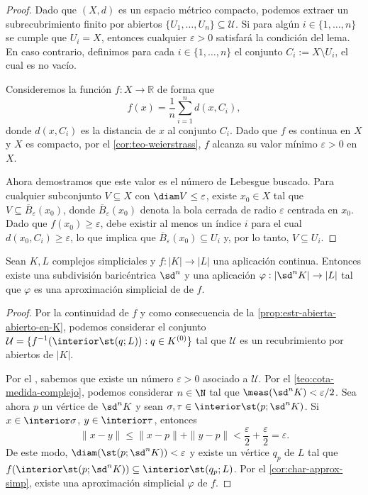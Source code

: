 \begin{proof}
	Dado que \((X,d)\) es un espacio métrico compacto, podemos extraer un subrecubrimiento finito por abiertos \(\{U_1, \ldots, U_n\} \subseteq \mathcal{U}\). Si para algún \(i \in \{1, \dots, n\}\) se cumple que \(U_i = X\), entonces cualquier \(\varepsilon > 0\) satisfará la condición del lema. En caso contrario, definimos para cada \(i \in \{1, \ldots, n\}\) el conjunto \(C_i := X \setminus U_i\), el cual es no vacío.

	Consideremos la función \( f \colon X \to \mathbb{R} \) de forma que
	\[
		f(x) = \frac{1}{n} \sum_{i=1}^{n} d(x, C_i),
	\]
	donde \(d(x, C_i)\) es la distancia de \(x\) al conjunto \(C_i\). Dado que \(f\) es continua en \(X\) y \(X\) es compacto, por el \autoref{cor:teo-weierstrass}, \(f\) alcanza su valor mínimo \(\varepsilon > 0\) en \(X\).

	Ahora demostramos que este valor es el número de Lebesgue buscado. Para cualquier subconjunto \(V \subseteq X\) con \(\diam V \leq \varepsilon\), existe \(x_0 \in X\) tal que \(V \subseteq \overline{B}_{\varepsilon}(x_0)\), donde \(\overline{B}_{\varepsilon}(x_0)\) denota la bola cerrada de radio \(\varepsilon\) centrada en \(x_0\). Dado que \(f(x_0) \geq \varepsilon\), debe existir al menos un índice \(i\) para el cual \(d(x_0, C_i) \geq \varepsilon\), lo que implica que \(\overline{B}_{\varepsilon}(x_0) \subseteq U_i\) y, por lo tanto, \(V \subseteq U_i\).
\end{proof}
\begin{teorema}
	\label{teo:approx-simp}
	Sean $K,L$ complejos simpliciales y $f: |K| \to |L|$ una aplicación continua. Entonces existe una subdivisión baricéntrica $\sd^n$ y una aplicación $\varphi : |\sd^n K| \to |L|$ tal que $\varphi$ es una aproximación simplicial de de $f$.
\end{teorema}
\begin{proof}
	Por la continuidad de $f$ y como consecuencia de la \autoref{prop:estr-abierta-abierto-en-K}, podemos considerar el conjunto $\mathcal{U} = \{f^{-1}(\interior \st(q;L)) : q \in K^{(0)}\}$ tal que $\mathcal{U}$ es un recubrimiento por abiertos de $|K|$.

	Por el , sabemos que existe un número $\varepsilon>0$ asociado a $\mathcal{U}$. Por el \autoref{teo:cota-medida-complejo}, podemos considerar $n \in \N$ tal que $\meas(\sd^n K) < \varepsilon/2$. Sea ahora $p$ un vértice de $\sd^n K$ y sean $\sigma,\tau \in \interior \st(p;\sd^n K)$. Si $x \in \interior \sigma$, $y \in \interior \tau$, entonces
	\[
		\|x-y\| \leq \|x-p\| + \|y-p\| < \frac{\varepsilon}{2} + \frac{\varepsilon}{2} = \varepsilon.
	\]
	De este modo, $\diam(\st(p;\sd^n K)) < \varepsilon$ y existe un vértice $q_p$ de $L$ tal que $f(\interior \st(p;\sd^n K)) \subseteq \interior \st(q_p;L)$. Por el \autoref{cor:char-approx-simp}, existe una aproximación simplicial $\varphi$ de $f$.
\end{proof}
